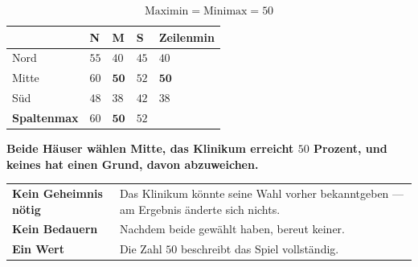 \begin{merksatz}
\[ \text{Maximin} = \text{Minimax} = 50 \]

\begin{center}
{\small
\renewcommand{\arraystretch}{1.55}
\begin{tabular}{@{}P{2.2cm}P{1.2cm}P{1.2cm}P{1.2cm}P{1.9cm}@{}}
\toprule
& \textbf{N} & \textbf{M} & \textbf{S} & \textbf{Zeilenmin}\\
\midrule
Nord & $55$ & $40$ & $45$ & $40$\\
Mitte & $60$ & $\mathbf{50}$ & $52$ & $\mathbf{50}$\\
Süd & $48$ & $38$ & $42$ & $38$\\
\midrule
\textbf{Spaltenmax} & $60$ & $\mathbf{50}$ & $52$ & \\
\bottomrule
\end{tabular}}
\end{center}

\begin{center}
\begin{minipage}{0.9\textwidth}
\textbf{Beide Häuser wählen Mitte, das Klinikum erreicht $50$ Prozent, und keines hat einen Grund, davon abzuweichen.}
\end{minipage}
\end{center}

\begin{center}
{\small
\renewcommand{\arraystretch}{1.5}
\begin{tabular}{@{}P{2.6cm}P{6.0cm}@{}}
\toprule
\textbf{Kein Geheimnis nötig} & Das Klinikum könnte seine Wahl vorher bekanntgeben --- am Ergebnis änderte sich nichts.\\
\textbf{Kein Bedauern} & Nachdem beide gewählt haben, bereut keiner.\\
\textbf{Ein Wert} & Die Zahl $50$ beschreibt das Spiel vollständig.\\
\bottomrule
\end{tabular}}
\end{center}

\begin{center}
\begin{minipage}{0.88\textwidth}
\end{minipage}
\end{center}
\end{merksatz}

